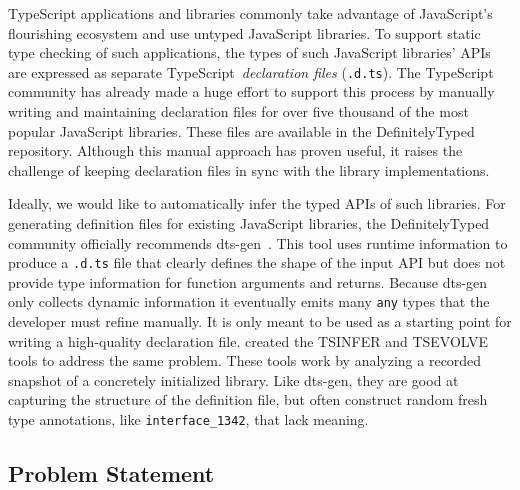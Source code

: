\documentclass[sigplan,10pt,review,anonymous]{acmart} %
\theoremstyle{plain}
\theoremstyle{remark}
\theoremstyle{definition}
\begin{document}
TypeScript applications and libraries commonly take advantage of JavaScript's flourishing ecosystem
and use untyped JavaScript libraries.
To support static type checking of such applications,
the types of such JavaScript libraries' APIs are expressed
as separate TypeScript~\emph{declaration files} (\lstinline{.d.ts}).
The TypeScript community has already
made a huge effort to support this process by manually writing and maintaining
declaration files for over five thousand of the most popular JavaScript
libraries. These files are available in the 
DefinitelyTyped~\citep{definitelytyped} repository.
Although this manual approach has proven
useful, it raises the challenge of keeping declaration files
in sync with the library implementations.

Ideally, we would like to automatically infer the typed APIs of such libraries.
For generating definition files for existing JavaScript libraries,
the DefinitelyTyped
community officially recommends dts-gen~\citep{dtsgen}.
This tool uses runtime information to produce a \lstinline{.d.ts} file that
clearly defines the shape of the input API but does not provide type information for
function arguments and returns. Because dts-gen only collects
dynamic information it eventually emits many \texttt{any} types that the developer must refine manually.
It is only meant to be used as a starting
point for writing a high-quality declaration file.
\citet{tstools2017} created the TSINFER and TSEVOLVE tools to address the same problem.
These tools work by analyzing a recorded snapshot of a concretely initialized library.
Like dts-gen, they are good at capturing the structure of the definition file,
but often construct random fresh type annotations, like \lstinline{interface_1342}, that lack meaning.

\subsection{Problem Statement}\label{ssec:problem}
% 

\end{document}
